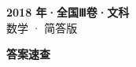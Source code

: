 \documentclass[zihao=-4, a4paper]{ctexart}
\begin{document}
\begin{center}
  {\Large\bfseries 2018 年·全国Ⅲ卷·文科}\\[4pt]
  {\large 数学 · 简答版}
\end{center}
\medskip
{}

\clearpage
{}
\begin{center}{\Large\bfseries 答案速查}\end{center}
\medskip

\end{document}
